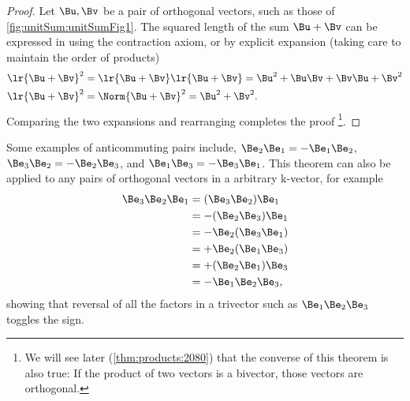 %
%

\begin{proof}
Let \( \Bu, \Bv \) be a pair of orthogonal vectors, such as those of
\cref{fig:unitSum:unitSumFig1}.  The squared length of the sum \( \Bu + \Bv \) can be expressed in using
the contraction axiom, or by explicit expansion (taking care to maintain the order of products)
\begin{align*}
\lr{ \Bu + \Bv }^2 &= \lr{ \Bu + \Bv }\lr{ \Bu + \Bv } = \Bu^2 + \Bu \Bv + \Bv \Bu + \Bv^2 \\
\lr{ \Bu + \Bv }^2 &= \Norm{ \Bu + \Bv }^2 = \Bu^2 + \Bv^2.
\end{align*}
Comparing the two expansions and rearranging completes the proof%
\footnote{We will see later (\cref{thm:products:2080}) that the converse of this theorem is also true: If the product of two vectors is a bivector, those vectors are orthogonal.}.
\end{proof}

Some examples of anticommuting pairs include,
\( \Be_2 \Be_1 = -\Be_1 \Be_2 \),
\( \Be_3 \Be_2 = -\Be_2 \Be_3 \), and
\( \Be_1 \Be_3 = -\Be_3 \Be_1 \).  This theorem can also be applied to any pairs of orthogonal vectors in a arbitrary k-vector, for example
\begin{equation}\label{eqn:normalVectors:300}
\begin{aligned}
\Be_3 \Be_2 \Be_1
&= (\Be_3 \Be_2) \Be_1 \\
&= -(\Be_2 \Be_3) \Be_1 \\
&= -\Be_2 (\Be_3 \Be_1) \\
&= +\Be_2 (\Be_1 \Be_3) \\
&= +(\Be_2 \Be_1) \Be_3 \\
&= -\Be_1 \Be_2 \Be_3,
\end{aligned}
\end{equation}
showing that reversal of all the factors in a trivector such as \( \Be_1 \Be_2 \Be_3 \) toggles the sign.


